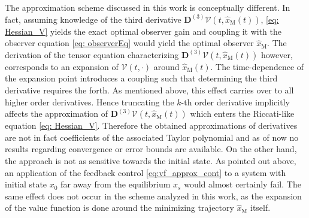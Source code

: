\documentclass[11pt,reqno]{amsart}
\numberwithin{equation}{section}
\theoremstyle{plain}
\newcommand{\TenDeriv}[1]{\mathbf{D}^{(#1)}}
\begin{document}
The approximation scheme discussed in this work is conceptually different. In fact, assuming knowledge of the third derivative $\TenDeriv{3} \mathcal{V} (t,\widehat{x}_{\mathrm{M}}(t))$, \cref{eq: Hessian_V} yields the exact optimal observer gain and coupling it with the observer equation \eqref{eq: observerEq} would yield the optimal observer $\widehat{x}_\mathrm{M}$. The derivation of the tensor equation characterizing $\TenDeriv{3} \mathcal{V} (t,\widehat{x}_{\mathrm{M}}(t))$ however, corresponds to an expansion of $\mathcal{V}(t,\cdot)$ around $\widehat{x}_\mathrm{M}(t)$. The time-dependence of the expansion point introduces a coupling such that determining the third derivative requires the forth. As mentioned above, this effect carries over to all higher order derivatives. Hence truncating the $k$-th order derivative implicitly affects the approximation of $\TenDeriv{3} \mathcal{V} (t,\widehat{x}_{\mathrm{M}}(t))$ which enters the Riccati-like equation \eqref{eq: Hessian_V}. Therefore the obtained approximations of derivatives are not in fact coefficients of the associated Taylor polynomial and as of now no results regarding convergence or error bounds are available. On the other hand, the approach is not as sensitive towards the initial state. As pointed out above, an application of the feedback control \eqref{eq:vf_approx_cont} to a system with initial state $x_0$ far away from the equilibrium $x_s$ would almost certainly fail. The same effect does not occur in the scheme analyzed in this work, as the expansion of the value function is done around the minimizing trajectory $\widehat{x}_\mathrm{M}$ itself. 
%
\end{document}
